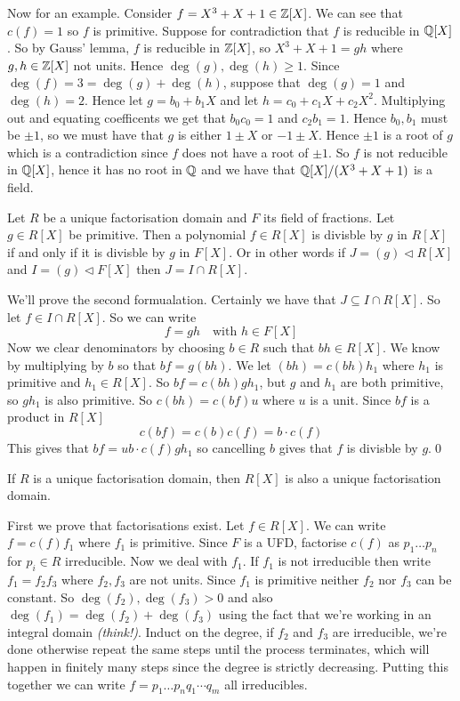 \documentclass{article}
\newcommand{\nrm}{\triangleleft}
\begin{document}
Now for an example. Consider $ f=X^3+X+1\in \mathbb{Z}[X] $. We can see that $ c(f) =1 $ so $ f $ is primitive. Suppose for contradiction that $ f $ is reducible in $ \mathbb{Q}[X] $. So by Gauss' lemma, $ f $ is reducible in $ \mathbb{Z}[X] $, so $ X^3+X+1=gh $ where $ g,h\in \mathbb{Z}[X] $ not units. Hence $ \deg(g),\deg(h)\ge 1 $. Since $ \deg(f)=3=\deg(g)+\deg(h) $, suppose that $ \deg(g)=1 $ and $ \deg(h)=2 $. Hence let $ g=b_0+b_1X $ and let $ h=c_0+c_1X+c_2X^2 $. Multiplying out and equating coefficents we get that $ b_0c_0=1 $ and $ c_2b_1=1 $. Hence $ b_0,b_1 $ must be $ \pm 1 $, so we must have that $ g $ is either $ 1\pm X $ or $ -1\pm X $. Hence $ \pm 1 $ is a root of $ g $ which is a contradiction since $ f $ does not have a root of $ \pm 1 $. So $ f $ is not reducible in $ \mathbb{Q}[X] $, hence it has no root in $ \mathbb{Q} $ and we have that $ \mathbb{Q}[X]/(X^3+X+1) $ is a field.
\begin{proposition}
	Let $ R $ be a unique factorisation domain and $ F $ its field of fractions. Let $ g\in R[X] $ be primitive. Then a polynomial $ f\in R[X] $ is divisble by $ g $ in $ R[X] $ if and only if it is divisble by $ g $ in $ F[X] $. Or in other words if $ J=(g)\nrm R[X] $ and $ I=(g)\nrm F[X] $ then $ J=I\cap R[X] $.
\end{proposition}
\pf We'll prove the second formualation. Certainly we have that $ J\subseteq I\cap R[X] $. So let $ f\in I\cap R[X] $. So we can write
\[
	f=gh \quad\text{with }h\in F[X] 
\]
Now we clear denominators by choosing $ b \in R $ such that $ bh\in R[X] $. We know by multiplying by $ b $ so that $ bf=g(bh) $. We let $ (bh)=c(bh)h_1 $ where $ h_1 $ is primitive and $ h_1\in R[X] $. So $ bf = c(bh)gh_1 $, but $ g $ and $ h_1 $ are both primitive, so $ gh_1 $ is also primitive. So $ c(bh) = c(bf)u $ where $ u $ is a unit. Since $ bf $ is a product in $ R[X] $
\[
  c(bf)=c(b)c(f)=b\cdot c(f)
\]
This gives that $ bf = ub\cdot c(f)gh_1 $ so cancelling $ b $ gives that $ f $ is divisble by $ g $.\qed
\begin{theorem}
	If $ R $ is a unique factorisation domain, then $ R[X] $ is also a unique factorisation domain.
\end{theorem}
\pf First we prove that factorisations exist. Let $ f\in R[X] $. We can write $ f = c(f)f_1 $ where $ f_1 $ is primitive. Since $ F $ is a UFD, factorise $ c(f) $ as $ p_1\dots p_n $ for $ p_i\in R $ irreducible. Now we deal with $ f_1 $. If $ f_1 $ is not irreducible then write $ f_1=f_2f_3 $ where $ f_2,f_3 $ are not units. Since $ f_1 $ is primitive neither $ f_2 $ nor $ f_3 $ can be constant. So $ \deg(f_2),\deg(f_3)>0 $ and also $ \deg(f_1)=\deg(f_2)+\deg(f_3) $ using the fact that we're working in an integral domain \textit{(think!)}. Induct on the degree, if $ f_2 $ and $ f_3 $ are irreducible, we're done otherwise repeat the same steps until the process terminates, which will happen in finitely many steps since the degree is strictly decreasing. Putting this together we can write $ f=p_1\dots p_nq_1\cdots q_m $ all irreducibles.\par
\end{document}
